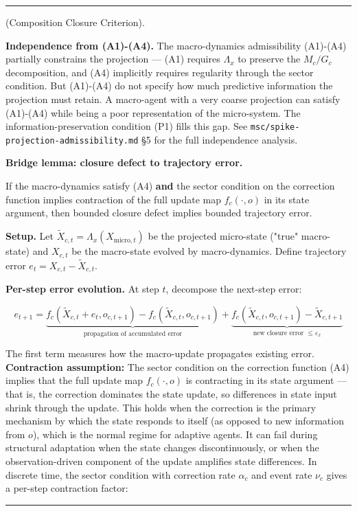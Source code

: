 \documentclass[11pt,oneside]{article}
\newcounter{claim}[section]
\renewcommand{\theclaim}{\thesection.\arabic{claim}}
\newenvironment{segment}[2]{%
  \refstepcounter{claim}%
  \bigskip\noindent\hrule\smallskip
  \noindent{\bfseries #1~\theclaim}\enskip(#2).\par\smallskip
  \noindent\ignorespaces
}{%
  \par\smallskip\noindent\hrule\bigskip
}
\newenvironment{formulation}[1][]{\begin{segment}{Formulation}{#1}}{\end{segment}}
\begin{document}
\begin{formulation}[Composition Closure Criterion]
\textbf{Independence from (A1)-(A4).} The macro-dynamics admissibility (A1)-(A4) partially constrains the projection — (A1) requires $\Lambda_x$ to preserve the $M_c / G_c$ decomposition, and (A4) implicitly requires regularity through the sector condition. But (A1)-(A4) do not specify how much predictive information the projection must retain. A macro-agent with a very coarse projection can satisfy (A1)-(A4) while being a poor representation of the micro-system. The information-preservation condition (P1) fills this gap. See \texttt{msc/spike-projection-admissibility.md} §5 for the full independence analysis.


\medskip\noindent\textbf{Bridge lemma: closure defect to trajectory error.}



If the macro-dynamics satisfy (A4) \textbf{and} the sector condition on the correction function implies contraction of the full update map $f_c(\cdot, o)$ in its state argument, then bounded closure defect implies bounded trajectory error.

\textbf{Setup.} Let $\tilde X_{c,t} = \Lambda_x(X_{\text{micro},t})$ be the projected micro-state ("true" macro-state) and $X_{c,t}$ be the macro-state evolved by macro-dynamics. Define trajectory error $e_t = X_{c,t} - \tilde X_{c,t}$.

\textbf{Per-step error evolution.} At step $t$, decompose the next-step error:

$$e_{t+1} = \underbrace{f_c(\tilde X_{c,t} + e_t, o_{c,t+1}) - f_c(\tilde X_{c,t}, o_{c,t+1})}_{\text{propagation of accumulated error}} + \underbrace{f_c(\tilde X_{c,t}, o_{c,t+1}) - \tilde X_{c,t+1}}_{\text{new closure error } \leq \varepsilon_x}$$

The first term measures how the macro-update propagates existing error. \textbf{Contraction assumption:} The sector condition on the correction function (A4) implies that the full update map $f_c(\cdot, o)$ is contracting in its state argument — that is, the correction dominates the state update, so differences in state input shrink through the update. This holds when the correction is the primary mechanism by which the state responds to itself (as opposed to new information from $o$), which is the normal regime for adaptive agents. It can fail during structural adaptation when the state changes discontinuously, or when the observation-driven component of the update amplifies state differences. In discrete time, the sector condition with correction rate $\alpha_c$ and event rate $\nu_c$ gives a per-step contraction factor:


\end{formulation}
\end{document}
